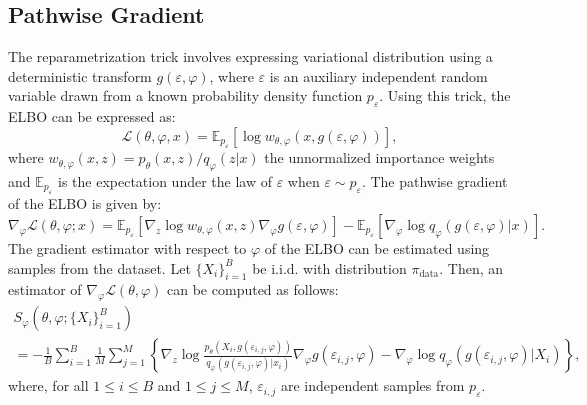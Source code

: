\documentclass[english,graybox,envcountchap,envcountsame,sectrefs,shortlabels]{svmono}
\theoremstyle{style}
\newcommand{\eqsp}{}
\begin{document}
\subsection{Pathwise Gradient}
The reparametrization trick involves expressing variational distribution using a deterministic transform $ g(\varepsilon, \varphi)$, where $\varepsilon$ is an auxiliary independent random variable drawn from a known probability density function $p_\varepsilon$.
Using this trick, the ELBO can be expressed as:
$$ \mathcal{L}(\theta, \varphi, x) = \mathbb{E}_{p_\varepsilon}\left[ \log w_{\theta, \varphi}(x, g(\varepsilon,\varphi)) \right]\eqsp,$$
where $w_{\theta, \varphi}(x,z) = p_{\theta}(x, z)/q_{\varphi}(z|x)$ the unnormalized importance weights and $\mathbb{E}_{p_\varepsilon}$ is the expectation under the law of $\varepsilon$ when $\varepsilon \sim p_\varepsilon$. The pathwise gradient \cite{kingma2013auto, rezende2014stochastic} of the ELBO is given by:
\begin{equation*}
\nabla^{}_{\varphi} \mathcal{L}(\theta, \varphi; x) =  \mathbb{E}_{p_\varepsilon}\left[ \nabla_z \log w_{\theta, \varphi}(x,z) \nabla_{\varphi} g(\varepsilon, \varphi) \right]  - \mathbb{E}_{p_\varepsilon}\left[\nabla_{\varphi} \log q_{\varphi}(g(\varepsilon, \varphi) | x) \right]\eqsp.
\end{equation*}
The gradient estimator with respect to $\varphi$ of the ELBO can be estimated using samples from the dataset. Let  $\{X_i\}_{i=1}^B$ be i.i.d. with distribution $\pi_{\mathrm{data}}$. Then, an estimator of $\nabla_{\varphi} \mathcal{L}(\theta, \varphi)$  can be computed as follows:
\begin{multline} \label{eq:grad_estimator_phi}
S_{\varphi}(\theta, \varphi; \{X_i\}_{i=1}^B) \\= -\frac{1}{B} \sum_{i=1}^{B} \frac{1}{M} \sum_{j=1}^{M} \left\{\nabla_z \log \frac{p_{\theta}(X_i, g(\varepsilon_{i,j}, \varphi))}{q_{\varphi}(g(\varepsilon_{i,j}, \varphi) | x_i)} \nabla_{\varphi} g(\varepsilon_{i,j}, \varphi) - \nabla_{\varphi} \log q_{\varphi}(g(\varepsilon_{i,j}, \varphi) | X_i)\right\}\eqsp,
\end{multline}
where, for all $1 \leq i \leq B$ and $1 \leq j \leq M$, $\varepsilon_{i,j}$ are independent samples from $p_{\varepsilon}$.
\end{document}
